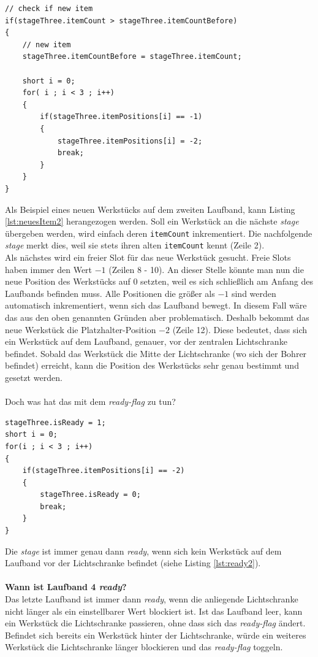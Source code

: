 \documentclass[fontsize=11pt,a4paper,final]{scrartcl}[2003/01/01]
\begin{document}
\begin{lstlisting}[caption={Beispiel: Neues Werkstück auf dem zweiten Laufband},label={lst:neuesItem2}]
// check if new item
if(stageThree.itemCount > stageThree.itemCountBefore)
{
   	// new item
   	stageThree.itemCountBefore = stageThree.itemCount;
   	
   	short i = 0;
   	for( i ; i < 3 ; i++)
   	{
   		if(stageThree.itemPositions[i] == -1)
   		{
   			stageThree.itemPositions[i] = -2;
   			break;
   		}
   	}
}
\end{lstlisting}
Als Beispiel eines neuen Werkstücks auf dem zweiten Laufband, kann Listing \ref{lst:neuesItem2} herangezogen werden.
Soll ein Werkstück an die nächste \textit{stage} übergeben werden, wird einfach deren \lstinline|itemCount| inkrementiert. Die nachfolgende \textit{stage} merkt dies, weil sie stets ihren alten \lstinline|itemCount| kennt (Zeile 2). \\
Als nächstes wird ein freier Slot für das neue Werkstück gesucht. Freie Slots haben immer den Wert $-1$ (Zeilen 8 - 10). An dieser Stelle könnte man nun die neue Position des Werkstücks auf $0$ setzten, weil es sich schließlich am Anfang des Laufbands befinden muss. Alle Positionen die größer als $-1$ sind werden automatisch inkrementiert, wenn sich das Laufband bewegt. In diesem Fall wäre das aus den oben genannten Gründen aber problematisch. Deshalb bekommt das neue Werkstück die Platzhalter-Position $-2$ (Zeile 12). Diese bedeutet, dass sich ein Werkstück auf dem Laufband, genauer, vor der zentralen Lichtschranke befindet. 
Sobald das Werkstück die Mitte der Lichtschranke (wo sich der Bohrer befindet) erreicht, kann die Position des Werkstücks sehr genau bestimmt und gesetzt werden. \\ \\
Doch was hat das mit dem \textit{ready-flag} zu tun? 
\begin{lstlisting}[caption={Beispiel: Ist Laufband 2 \textit{ready}?},label={lst:ready2}]
stageThree.isReady = 1;
short i = 0;
for(i ; i < 3 ; i++)
{
	if(stageThree.itemPositions[i] == -2)
	{
		stageThree.isReady = 0;
		break;
	}
}
\end{lstlisting}
Die \textit{stage} ist immer genau dann \textit{ready}, wenn sich kein Werkstück auf dem Laufband vor der Lichtschranke befindet (siehe Listing \ref{lst:ready2}). \\ \\
\textbf{Wann ist Laufband 4 \textit{ready}?} \\
Das letzte Laufband ist immer dann \textit{ready}, wenn die anliegende Lichtschranke nicht länger als ein einstellbarer Wert blockiert ist. Ist das Laufband leer, kann ein Werkstück die Lichtschranke passieren, ohne dass sich das \textit{ready-flag} ändert. Befindet sich bereits ein Werkstück hinter der Lichtschranke, würde ein weiteres Werkstück die Lichtschranke länger blockieren und das \textit{ready-flag} toggeln. \\ 
\end{document}
